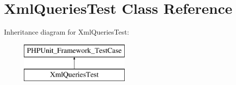 \hypertarget{classXmlQueriesTest}{\section{Xml\+Queries\+Test Class Reference}
\label{classXmlQueriesTest}
}
Inheritance diagram for Xml\+Queries\+Test\+:\begin{figure}[H]
\begin{center}
\leavevmode
\includegraphics[height=2.000000cm]{classXmlQueriesTest}
\end{center}
\end{figure}
